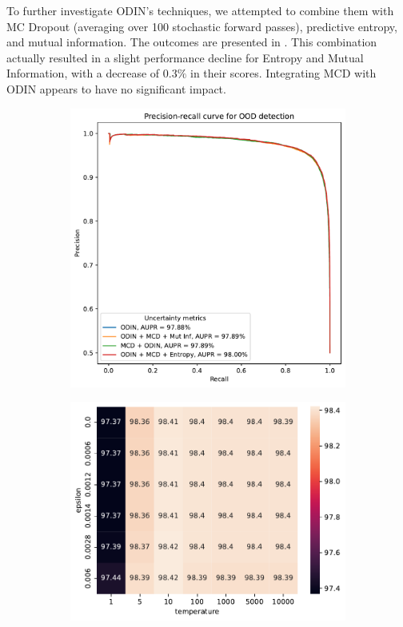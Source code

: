 To further investigate ODIN's techniques, we attempted to combine them with MC Dropout (averaging over 100 stochastic forward passes), predictive entropy, and mutual information. The outcomes are presented in . This combination actually resulted in a slight performance decline for Entropy and Mutual Information, with a decrease of $0.3\%$ in their scores. Integrating MCD with ODIN appears to have no significant impact. 
\begin{figure}[H]
    \centering
    \begin{subfigure}{0.45\textwidth}
        \includegraphics[width=\textwidth]{OOD_aupr_combo.pdf}
        \caption{}
        \label{fig:OOD_aupr_combo}
    \end{subfigure}%
    \begin{subfigure}{0.45\textwidth}
        \includegraphics[width=\textwidth]{odin_grid_search.pdf}

\end{subfigure}
\end{figure}
